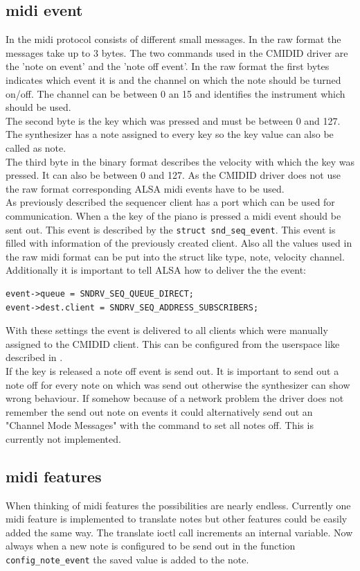 \documentclass[paper=a4,fontsize=11pt,twocolumn,pagesize,bibtotoc]{scrartcl}
\begin{document}
\subsection{midi event}
In the midi protocol consists of different small messages. In the raw format the messages take up to 3 bytes. The two commands used in the CMIDID driver are the 'note on event' and the 'note off event'. In the raw format the first bytes indicates which event it is and the channel on which the note should be turned on/off. The channel can be between 0 an 15 and identifies the instrument which should be used.
\\
The second byte is the key which was pressed and must be between 0 and 127. The synthesizer has a note assigned to every key so the key value can also be called as note.\\
 The third byte in the binary format describes the velocity with which the key was pressed. It can also be between 0 and 127. As the CMIDID driver does not use the raw format corresponding ALSA midi events have to be used.\\
As previously described the sequencer client has a port which can be used for communication. When a the key of the piano is pressed a midi event should be sent out.
This event is described by the \texttt{struct snd\_seq\_event}. This event is filled with information of the previously created client.  Also all the values used in the raw midi format can be put into the struct like type, note, velocity channel. Additionally it is important to tell ALSA how to deliver the the event:
\begin{lstlisting}
event->queue = SNDRV_SEQ_QUEUE_DIRECT;
event->dest.client = SNDRV_SEQ_ADDRESS_SUBSCRIBERS;
\end{lstlisting}
With these settings the event is delivered to all clients which were manually assigned to the CMIDID client. This can be configured from the userspace like described in
 .\\
 If the key is released a note off event is send out. It is important to send out a note off for every note on which was send out otherwise the synthesizer can show wrong behaviour. If somehow because of a network problem the driver does not remember the send out note on events it could alternatively send out an "Channel Mode Messages" with the command to set all notes off. This is currently not implemented.
\cite{midimessages}
\subsection{midi features}
When thinking of midi features the possibilities are nearly endless. Currently one midi feature is implemented to translate notes but other features could be easily added the same way. The translate ioctl call increments an internal variable. Now always when a new note is configured to be send out in the function \texttt{config\_note\_event} the saved value is added to the note.
\end{document}
